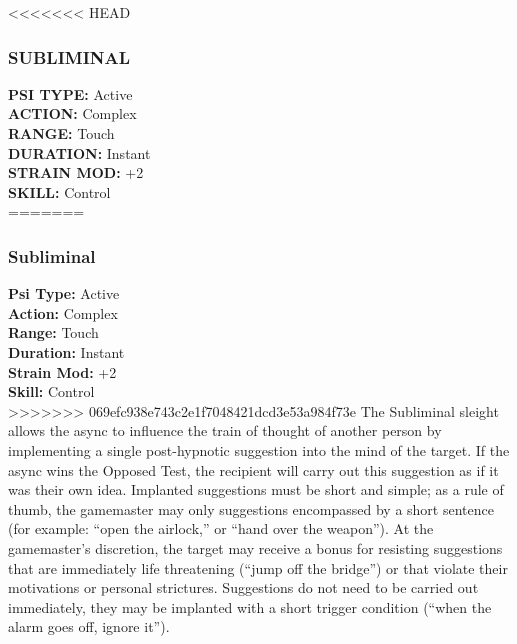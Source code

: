 <<<<<<< HEAD \subsubsection{SUBLIMINAL} \textbf{PSI TYPE:} Active \\ \textbf{ACTION:} Complex \\ \textbf{RANGE:} Touch \\ \textbf{DURATION:} Instant \\ \textbf{STRAIN MOD:} +2 \\ \textbf{SKILL:} Control\\ ======= \subsubsection{Subliminal} \textbf{Psi Type:} Active \\ \textbf{Action:} Complex \\ \textbf{Range:} Touch \\ \textbf{Duration:} Instant \\ \textbf{Strain Mod:} +2 \\ \textbf{Skill:} Control\\ >>>>>>> 069efc938e743c2e1f7048421dcd3e53a984f73e The Subliminal sleight allows the async to influence the train of thought of another person by implementing a single post-hypnotic suggestion into the mind of the target. If the async wins the Opposed Test, the recipient will carry out this suggestion as if it was their own idea. Implanted suggestions must be short and simple; as a rule of thumb, the gamemaster may only suggestions encompassed by a short sentence (for example: “open the airlock,” or “hand over the weapon”). At the gamemaster’s discretion, the target may receive a bonus for resisting suggestions that are immediately life threatening (“jump off the bridge”) or that violate their motivations or personal strictures. Suggestions do not need to be carried out immediately, they may be implanted with a short trigger condition (“when the alarm goes off, ignore it”). 

